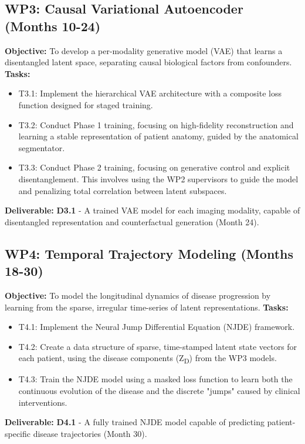 \documentclass[11pt, a4paper]{article}
\begin{document}
\subsection*{WP3: Causal Variational Autoencoder (Months 10-24)}
\textbf{Objective:} To develop a per-modality generative model (VAE) that learns a disentangled latent space, separating causal biological factors from confounders.
\textbf{Tasks:}
\begin{itemize}
    \item T3.1: Implement the hierarchical VAE architecture with a composite loss function designed for staged training.
    \item T3.2: Conduct Phase 1 training, focusing on high-fidelity reconstruction and learning a stable representation of patient anatomy, guided by the anatomical segmentator.
    \item T3.3: Conduct Phase 2 training, focusing on generative control and explicit disentanglement. This involves using the WP2 supervisors to guide the model and penalizing total correlation between latent subspaces.
\end{itemize}
\textbf{Deliverable:} \textbf{D3.1} - A trained VAE model for each imaging modality, capable of disentangled representation and counterfactual generation (Month 24).

\subsection*{WP4: Temporal Trajectory Modeling (Months 18-30)}
\textbf{Objective:} To model the longitudinal dynamics of disease progression by learning from the sparse, irregular time-series of latent representations.
\textbf{Tasks:}
\begin{itemize}
    \item T4.1: Implement the Neural Jump Differential Equation (NJDE) framework.
    \item T4.2: Create a data structure of sparse, time-stamped latent state vectors for each patient, using the disease components (Z\textsubscript{D}) from the WP3 models.
    \item T4.3: Train the NJDE model using a masked loss function to learn both the continuous evolution of the disease and the discrete "jumps" caused by clinical interventions.
\end{itemize}
\textbf{Deliverable:} \textbf{D4.1} - A fully trained NJDE model capable of predicting patient-specific disease trajectories (Month 30).
\end{document}
